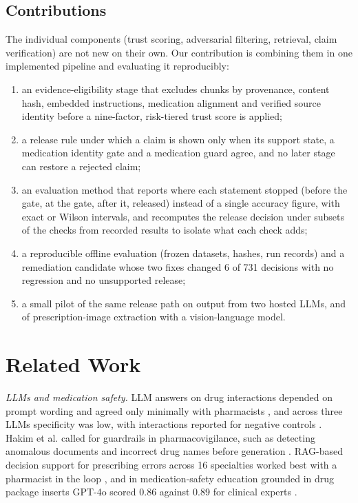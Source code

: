 \documentclass[conference]{IEEEtran}
\begin{document}
\subsection{Contributions}

The individual components (trust scoring, adversarial filtering, retrieval, claim verification) are not new on their
own. Our contribution is combining them in one implemented pipeline and evaluating it reproducibly:
\begin{enumerate}
\item an evidence-eligibility stage that excludes chunks by provenance, content hash, embedded instructions, medication
alignment and verified source identity before a nine-factor, risk-tiered trust score is applied;
\item a release rule under which a claim is shown only when its support state, a medication identity gate and a
medication guard agree, and no later stage can restore a rejected claim;
\item an evaluation method that reports where each statement stopped (before the gate, at the gate, after it, released)
instead of a single accuracy figure, with exact or Wilson intervals, and recomputes the release decision under
subsets of the checks from recorded results to isolate what each check adds;
\item a reproducible offline evaluation (frozen datasets, hashes, run records) and a remediation candidate whose two
fixes changed 6 of 731 decisions with no regression and no unsupported release;
\item a small pilot of the same release path on output from two hosted LLMs, and of prescription-image extraction
with a vision-language model.
\end{enumerate}

\section{Related Work}
\label{sec:related}

\emph{LLMs and medication safety.} LLM answers on drug interactions depended on prompt wording and agreed only
minimally with pharmacists \cite{krishnan2024ddi}, and across three LLMs specificity was low, with interactions reported
for negative controls \cite{sicard2025ddi}. Hakim et al. called for guardrails in pharmacovigilance, such as detecting
anomalous documents and incorrect drug names before generation \cite{hakim2025guardrails}. RAG-based decision support
for prescribing errors across 16 specialties worked best with a pharmacist in the loop \cite{ong2025medsafety}, and in
medication-safety education grounded in drug package inserts GPT-4o scored 0.86 against 0.89 for clinical experts
\cite{sun2026medrag}.
\end{document}
